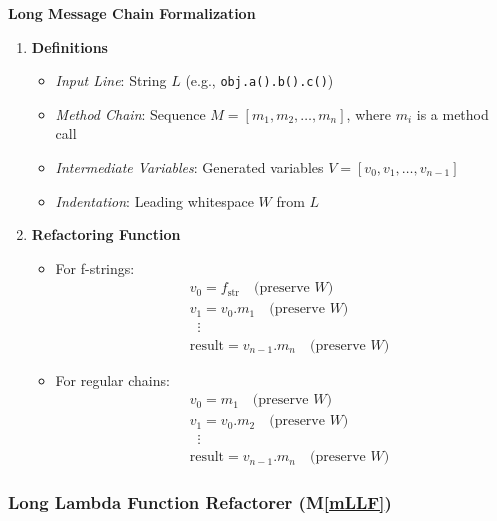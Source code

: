 \documentclass[12pt, titlepage]{article}
\newcommand{\mref}[1]{M\ref{#1}}
\begin{document}
\textbf{Long Message Chain Formalization}
\begin{enumerate}
  \item \textbf{Definitions}
  \begin{itemize}
      \item \textit{Input Line}: String \( L \) (e.g., \texttt{obj.a().b().c()})
      \item \textit{Method Chain}: Sequence \( M = [m_1, m_2, \dots, m_n] \), where \( m_i \) is a method call
      \item \textit{Intermediate Variables}: Generated variables \( V = [v_0, v_1, \dots, v_{n-1}] \)
      \item \textit{Indentation}: Leading whitespace \( W \) from \( L \)
  \end{itemize}

  \item \textbf{Refactoring Function}
  \begin{itemize}
      \item For f-strings:
      \[
      \begin{aligned}
          &v_0 = f_{\text{str}} \quad \text{(preserve } W\text{)} \\
          &v_1 = v_0.m_1 \quad \text{(preserve } W\text{)} \\
          &\;\;\vdots \\
          &\text{result} = v_{n-1}.m_n \quad \text{(preserve } W\text{)}
      \end{aligned}
      \]
      \item For regular chains:
      \[
      \begin{aligned}
          &v_0 = m_1 \quad \text{(preserve } W\text{)} \\
          &v_1 = v_0.m_2 \quad \text{(preserve } W\text{)} \\
          &\;\;\vdots \\
          &\text{result} = v_{n-1}.m_n \quad \text{(preserve } W\text{)}
      \end{aligned}
      \]
  \end{itemize}
\end{enumerate}


\subsubsection{Long Lambda Function Refactorer (\mref{mLLF})}
\end{document}
